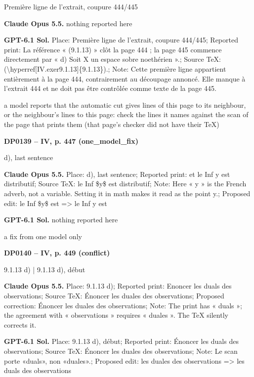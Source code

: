 Première ligne de l'extrait, coupure 444/445\par
\textbf{Claude Opus 5.5.} nothing reported here\par
\textbf{GPT-6.1 Sol.} Place: Première ligne de l'extrait, coupure 444/445; Reported print: La référence « (9.1.13) » clôt la page 444 ; la page 445 commence directement par « d) Soit X un espace sobre noethérien ».; Source TeX: (\textbackslash{}hyperref[IV.exer9.1.13]\{9.1.13\}).; Note: Cette première ligne appartient entièrement à la page 444, contrairement au découpage annoncé. Elle manque à l'extrait 444 et ne doit pas être contrôlée comme texte de la page 445.\par
a model reports that the automatic cut gives lines of this page to its neighbour, or the neighbour's lines to this page: check the lines it names against the scan of the page that prints them (that page's checker did not have their TeX)\par
\par\noindent\hypertarget{DP0139}{}\textbf{DP0139 -- IV, p. 447 (one\_model\_fix)}\par
d), last sentence\par
\textbf{Claude Opus 5.5.} Place: d), last sentence; Reported print: et le Inf y est distributif; Source TeX: le Inf \$y\$ est distributif; Note: Here « y » is the French adverb, not a variable. Setting it in math makes it read as the point y.; Proposed edit: le Inf \$y\$ est =\allowbreak > le Inf y est\par
\textbf{GPT-6.1 Sol.} nothing reported here\par
a fix from one model only\par
\par\noindent\hypertarget{DP0140}{}\textbf{DP0140 -- IV, p. 449 (conflict)}\par
9.1.13 d) | 9.1.13 d), début\par
\textbf{Claude Opus 5.5.} Place: 9.1.13 d); Reported print: Enoncer les duals des observations; Source TeX: Énoncer les duales des observations; Proposed correction: Énoncer les duales des observations; Note: The print has « duals »; the agreement with « observations » requires « duales ». The TeX silently corrects it.\par
\textbf{GPT-6.1 Sol.} Place: 9.1.13 d), début; Reported print: Énoncer les duals des observations; Source TeX: Énoncer les duales des observations; Note: Le scan porte «duals», non «duales».; Proposed edit: les duales des observations =\allowbreak > les duals des observations\par
